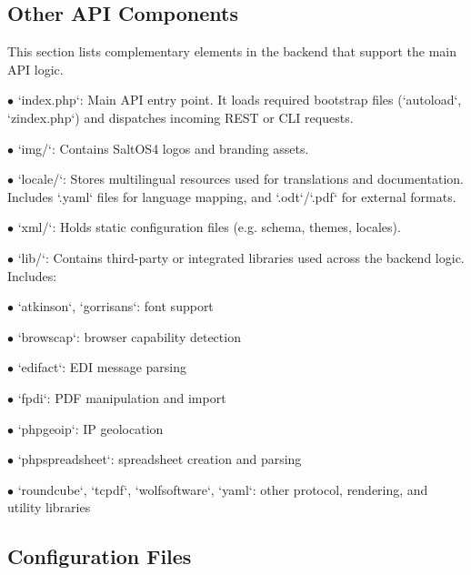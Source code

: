 \documentclass[a4paper]{article}
\begin{document}
\hypertarget{toc11}{}
\subsection{Other API Components}

This section lists complementary elements in the backend that support the main API logic.

\begin{compactitem}
\item[\color{myblue}$\bullet$] `index.php`: Main API entry point. It loads required bootstrap files (`autoload`, `zindex.php`) and dispatches incoming REST or CLI requests.
\item[\color{myblue}$\bullet$] `img/`: Contains SaltOS4 logos and branding assets.
\item[\color{myblue}$\bullet$] `locale/`: Stores multilingual resources used for translations and documentation. Includes `.yaml` files for language mapping, and `.odt`/`.pdf` for external formats.
\item[\color{myblue}$\bullet$] `xml/`: Holds static configuration files (e.g. schema, themes, locales).
\item[\color{myblue}$\bullet$] `lib/`: Contains third-party or integrated libraries used across the backend logic. Includes:
  \begin{compactitem}
  \item[\color{myblue}$\bullet$] `atkinson`, `gorrisans`: font support
  \item[\color{myblue}$\bullet$] `browscap`: browser capability detection
  \item[\color{myblue}$\bullet$] `edifact`: EDI message parsing
  \item[\color{myblue}$\bullet$] `fpdi`: PDF manipulation and import
  \item[\color{myblue}$\bullet$] `phpgeoip`: IP geolocation
  \item[\color{myblue}$\bullet$] `phpspreadsheet`: spreadsheet creation and parsing
  \item[\color{myblue}$\bullet$] `roundcube`, `tcpdf`, `wolfsoftware`, `yaml`: other protocol, rendering, and utility libraries
  \end{compactitem}
\end{compactitem}

\hypertarget{toc12}{}
\subsection{Configuration Files}
\end{document}
